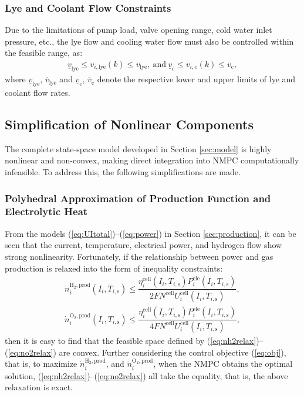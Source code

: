 \documentclass[review,3p,10pt]{elsarticle}
\begin{document}
\subsubsection{Lye and Coolant Flow Constraints}

Due to the limitations of pump load, valve opening range, cold water inlet pressure, etc., the lye flow and cooling water flow must also be controlled within the feasible range, as:
\begin{gather}
   \underline{v}_{\text{lye}} \le v_{i,\text{lye}}(k) \le \overline{v}_{\text{lye}}, \ \text{and} \  %
   \underline{v}_{\text{c}} \le v_{i,\text{c}}(k) \le \overline{v}_{\text{c}},  \label{eq:limitcool}
\end{gather}
\noindent
where $\underline{v}_{\text{lye}}$, $\overline{v}_{\text{lye}}$ and $\underline{v}_{\text{c}}$, $\overline{v}_{\text{c}}$ denote the respective lower and upper limits of lye and coolant flow rates.

\subsection{Simplification of Nonlinear Components}
\label{sec:simplification}

The complete state-space model developed in Section \ref{sec:model} is highly nonlinear and non-convex, making direct integration into NMPC computationally infeasible. To address this, the following simplifications are made.

\subsubsection{Polyhedral Approximation of Production Function and Electrolytic Heat}
\label{sec:polynomial}

From the models (\ref{eq:UItotal})--(\ref{eq:power}) in Section \ref{sec:production}, it can be seen that the current, temperature, electrical power, and hydrogen flow show strong nonlinearity. Fortunately, if the relationship between power and gas production is relaxed into the form of inequality constraints:
\begin{gather}
  \dot{n}_{i}^{\text{H}_2,\text{prod}} (I_i,T_{i,\text{s}}) \le \dfrac{ \eta_{i}^{\text{cell}}(I_i,T_{i,\text{s}})  P_{i}^{\text{ele}}(I_i,T_{i,\text{s}}) }{2 F N^{\text{cell}} U_{i}^{\text{cell}} (I_i,T_{i,\text{s}}) }, \label{eq:nh2relax} \\
  \dot{n}_{i}^{\text{O}_2,\text{prod}} (I_i,T_{i,\text{s}}) \le \dfrac{ \eta_{i}^{\text{cell}}(I_i,T_{i,\text{s}})  P_{i}^{\text{ele}}(I_i,T_{i,\text{s}}) }{4 F N^{\text{cell}} U_{i}^{\text{cell}} (I_i,T_{i,\text{s}}) }, \label{eq:no2relax}
\end{gather}
\noindent
then it is easy to find that the feasible space defined by (\ref{eq:nh2relax})--(\ref{eq:no2relax}) are convex. Further considering the control objective (\ref{eq:obj}), that is, to maximize $\dot{n}_{i}^{\text{H}_2,\text{prod}}$, and $\dot{n}_{i}^{\text{O}_2,\text{prod}}$, when the NMPC obtains the optimal solution, (\ref{eq:nh2relax})--(\ref{eq:no2relax}) all take the equality, that is, the above relaxation is exact.
\end{document}
